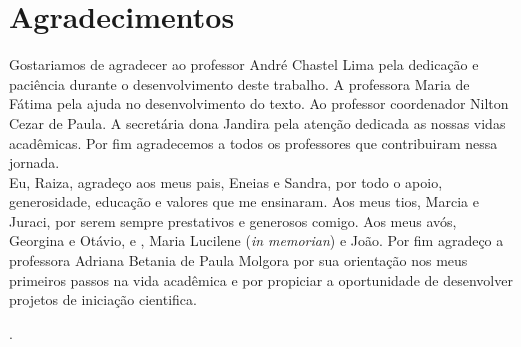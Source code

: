 %

\chapter*{Agradecimentos}
\thispagestyle{plain}
\normalsize{Gostariamos de agradecer ao professor André Chastel Lima pela dedicação e paciência  durante o desenvolvimento deste trabalho. A professora Maria de Fátima pela ajuda no desenvolvimento do texto. Ao professor coordenador Nilton Cezar de Paula. A secretária dona Jandira pela atenção dedicada as nossas vidas acadêmicas. Por fim agradecemos a todos os professores que contribuiram nessa jornada.\\

\quad Eu, Raiza, agradeço aos meus pais, Eneias e Sandra, por todo o apoio, generosidade, educação e valores que me ensinaram. Aos meus tios, Marcia e Juraci, por serem sempre prestativos e generosos comigo. Aos meus avós, Georgina e Otávio, e , Maria Lucilene (\textit{in memorian}) e João. Por fim agradeço a professora Adriana Betania de Paula Molgora por sua orientação nos meus primeiros passos na vida acadêmica e por propiciar a oportunidade de desenvolver projetos de iniciação cientifica.  


}.
